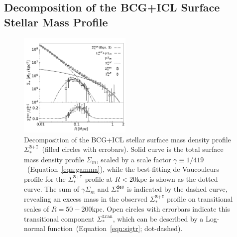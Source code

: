 \documentclass[fleqn,usenatbib]{mnras}
\newcommand{\sigbi}{\Sigma_*^{\texttt{B+I}}}
\newcommand{\sigm}{\Sigma_m}
\newcommand{\sigdev}{\Sigma_*^{\texttt{deV}}}
\newcommand{\sigtr}{\Sigma_*^{\texttt{tran}}}
\newcommand{\kpc}{\mathrm{kpc}}
\newcommand\xkchen[1]{{\color{cyan} {#1}}}
\begin{document}
\subsection{Decomposition of the BCG+ICL Surface Stellar Mass Profile}
\label{subsec:decomposition}

\begin{figure}
    \includegraphics[width=0.48\textwidth]{fig/DM_Ng_compare.pdf}
    \caption{Decomposition of the BCG+ICL stellar surface mass density
    profile $\sigbi$~(filled circles with errobars). Solid curve is the
    total surface mass density profile $\sigm$, scaled by a scale factor
    $\gamma{\equiv}1/419$~(Equation~\ref{eqn:gamma}), while the
    best-fitting de Vaucouleurs profile for the $\sigbi$ profile at
    \xkchen{$R<20\kpc$} is shown as the dotted curve.  The sum of $\gamma\sigm$ and
    $\sigdev$ is indicated by the dashed curve, revealing an excess mass in
    the observed $\sigbi$ profile on transitional scales of
    $R{=}50{-}200\kpc$. Open circles with errorbars indicate this
    transitional component $\sigtr$, which can be described by a Log-normal
    function~(Equation~\ref{eqn:sigtr};
    dot-dashed).\label{fig:decomposition} }
\end{figure}
\end{document}
